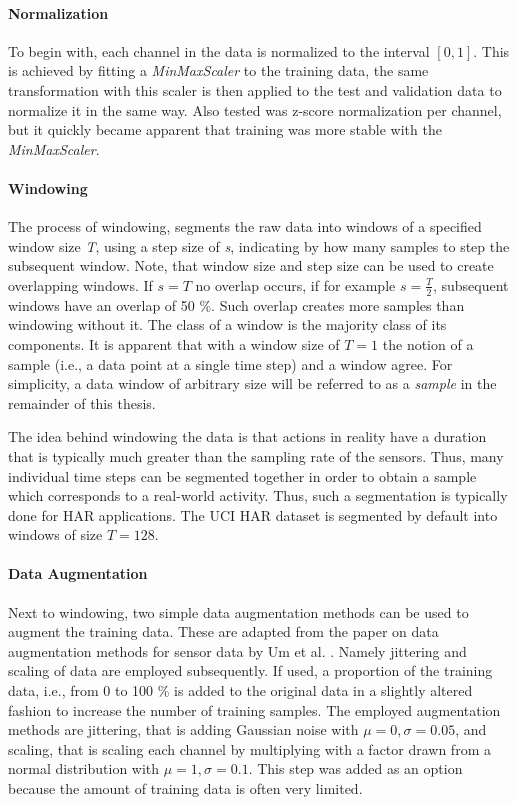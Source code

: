 \documentclass[11pt,titlepage,oneside,openany]{book}
\begin{document}
\paragraph{Normalization}
To begin with, each channel in the data is normalized to the interval $[0,1]$. This is achieved by fitting a \emph{MinMaxScaler} to the training data, the same transformation with this scaler is then applied to the test and validation data to normalize it in the same way. Also tested was z-score normalization per channel, but it quickly became apparent that training was more stable with the \emph{MinMaxScaler}.

\paragraph{Windowing}
The process of windowing, segments the raw data into windows of a specified window size \emph{T}, using a step size of \emph{s}, indicating by how many samples to step the subsequent window. Note, that window size and step size can be used to create overlapping windows. If $s=T$ no overlap occurs, if for example $s = \frac{T}{2}$, subsequent windows have an overlap of 50 \%. Such overlap creates more samples than windowing without it. The class of a window is the majority class of its components. It is apparent that with a window size of $T=1$ the notion of a sample (i.e., a data point at a single time step) and a window agree. For simplicity, a data window of arbitrary size will be referred to as a \emph{sample} in the remainder of this thesis.

The idea behind windowing the data is that actions in reality have a duration that is typically much greater than the sampling rate of the sensors. Thus, many individual time steps can be segmented together in order to obtain a sample which corresponds to a real-world activity. Thus, such a segmentation is typically done for HAR applications. The UCI HAR dataset is segmented by default into windows of size $T=128$.

\paragraph{Data Augmentation}
Next to windowing, two simple data augmentation methods can be used to augment the training data. These are adapted from the paper on data augmentation methods for sensor data by Um et al. \cite{um_data_2017}. Namely jittering and scaling of data are employed subsequently. If used, a proportion of the training data, i.e., from 0 to 100 \% is added to the original data in a slightly altered fashion to increase the number of training samples. The employed augmentation methods are jittering, that is adding Gaussian noise with $\mu = 0, \sigma = 0.05$, and scaling, that is scaling each channel by multiplying with a factor drawn from a normal distribution with $\mu = 1, \sigma = 0.1$. This step was added as an option because the amount of training data is often very limited.
\end{document}
